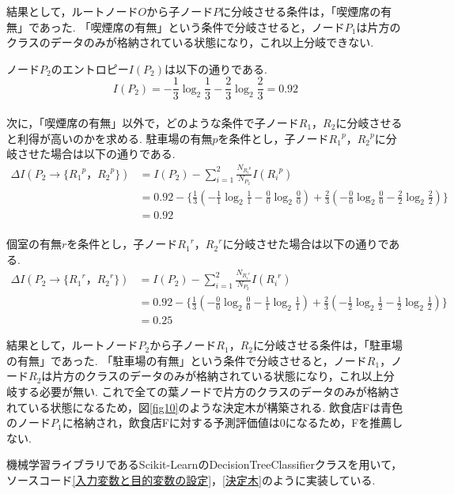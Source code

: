 \documentclass[12pt,a4j]{jreport}
\begin{document}
結果として，ルートノード\(O\)から子ノード\(P\)に分岐させる条件は，「喫煙席の有無」であった.
「喫煙席の有無」という条件で分岐させると，ノード\(P_1\)は片方のクラスのデータのみが格納されている状態になり，これ以上分岐できない.

ノード\(P_2\)のエントロピー\(I(P_2)\)は以下の通りである.\\
\[
I(P_2) = - \frac{1}{3} \log_2 \frac{1}{3} - \frac{2}{3} \log_2 \frac{2}{3} = 0.92
\]\\
次に，「喫煙席の有無」以外で，どのような条件で子ノード\(R_1，R_2\)に分岐させると利得が高いのかを求める.
駐車場の有無\(p\)を条件とし，子ノード\({R_1}^p，{R_2}^p\)に分岐させた場合は以下の通りである.\\
\begin{align*}
  \Delta I(P_2→\{{R_1}^p，{R_2}^p\})
  &= I(P_2) - \sum_{i=1}^{2} \frac{N_{{R_i}^p}}{N_{P_2}} I({R_i}^p)\\ 
  &= 0.92 - \{\frac{1}{3} (- \frac{1}{1} \log_2 \frac{1}{1} - \frac{0}{0} \log_2 \frac{0}{0}) + \frac{2}{3} (- \frac{0}{0} \log_2 \frac{0}{0} - \frac{2}{2} \log_2 \frac{2}{2})\}\\
  &= 0.92
\end{align*}\\
個室の有無\(r\)を条件とし，子ノード\({R_1}^r，{R_2}^r\)に分岐させた場合は以下の通りである.\\
\begin{align*}
  \Delta I(P_2→\{{R_1}^r，{R_2}^r\})
  &= I(P_2) - \sum_{i=1}^{2} \frac{N_{{R_i}^r}}{N_{P_2}} I({R_i}^r)\\ 
  &= 0.92 - \{\frac{1}{3} (- \frac{0}{0} \log_2 \frac{0}{0} - \frac{1}{1} \log_2 \frac{1}{1}) + \frac{2}{3} (- \frac{1}{2} \log_2 \frac{1}{2} - \frac{1}{2} \log_2 \frac{1}{2})\}\\
  &= 0.25
\end{align*}

結果として，ルートノード\(P_2\)から子ノード\(R_1，R_2\)に分岐させる条件は，「駐車場の有無」であった.
「駐車場の有無」という条件で分岐させると，ノード\(R_1\)，ノード\(R_2\)は片方のクラスのデータのみが格納されている状態になり，これ以上分岐する必要が無い.
これで全ての葉ノードで片方のクラスのデータのみが格納されている状態になるため，図\ref{fig10}のような決定木が構築される.
飲食店Fは青色のノード\(P_1\)に格納され，飲食店Fに対する予測評価値は0になるため，Fを推薦しない.

機械学習ライブラリであるScikit-LearnのDecisionTreeClassifierクラスを用いて，ソースコード\ref{入力変数と目的変数の設定}，\ref{決定木}のように実装している.\\
\end{document}
